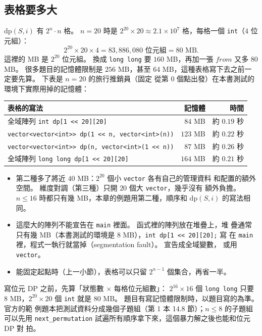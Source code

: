 \subsection{表格要多大}
\label{sec:bm-memory}

$\mathrm{dp}(S, i)$ 有 $2^n \cdot n$ 格。 $n = 20$ 時是 $2^{20} \times 20 \approx 2.1 \times 10^7$
格，每格一個 \texttt{int}（$4$ 位元組）：
\[
2^{20} \times 20 \times 4 = 83{,}886{,}080 \text{ 位元組} = 80 \text{ MB}.
\]
這裡的 MB 是 $2^{20}$ 位元組。 換成 \texttt{long long} 要 $160$ MB，再加一張
$\mathit{from}$ 又多 $80$ MB。 很多題目的記憶體限制是 $256$ MB，甚至
$64$ MB，這種表格寫下去之前一定要先算。 下表是 $n = 20$ 的旅行推銷員（固定
從第 $0$ 個點出發）在本書測試的環境下實際用掉的記憶體：

\begin{center}
\begin{tabular}{lrr}
\toprule
表格的寫法 & 記憶體 & 時間 \\
\midrule
全域陣列 \texttt{int dp[1 << 20][20]} & $84$ MB & 約 $0.19$ 秒 \\
\texttt{vector<vector<int>> dp(1 << n, vector<int>(n))} & $123$ MB & 約 $0.22$ 秒 \\
\texttt{vector<vector<int>> dp(n, vector<int>(1 << n))} & $87$ MB & 約 $0.26$ 秒 \\
全域陣列 \texttt{long long dp[1 << 20][20]} & $164$ MB & 約 $0.21$ 秒 \\
\bottomrule
\end{tabular}
\end{center}

\begin{itemize}
\item 第二種多了將近 $40$ MB：$2^{20}$ 個小 \texttt{vector} 各有自己的管理資料
和配置的額外空間。 維度對調（第三種）只開 $20$ 個大 \texttt{vector}，幾乎沒有
額外負擔。 $n \le 16$ 時都只有幾 MB，本章的例題用第二種，順序和
$\mathrm{dp}(S, i)$ 的寫法相同。
\item 這麼大的陣列不能宣告在 \texttt{main} 裡面。 函式裡的陣列放在堆疊上，堆
疊通常只有幾 MB（本書測試的環境是 $8$ MB），\texttt{int dp[1 << 20][20];} 寫
在 \texttt{main} 裡，程式一執行就當掉（segmentation fault）。 宣告成全域變數，
或用 \texttt{vector}。
\item 能固定起點時（上一小節），表格可以只留 $2^{n - 1}$ 個集合，再省一半。
\end{itemize}

\begin{apcsnote}
寫位元 DP 之前，先算「狀態數 $\times$ 每格位元組數」：
$2^{16} \times 16$ 個 \texttt{long long} 只要 $8$ MB，$2^{20} \times 20$ 個
\texttt{int} 就是 $80$ MB。 題目有寫記憶體限制時，以題目寫的為準。 官方的範
例題本把測試資料分成幾個子題組（第 1 本 14.8 節）；$n \le 8$ 的子題組可以先用
\texttt{next\_permutation} 試遍所有順序拿下來，這個暴力解之後也能和位元 DP 對
拍。
\end{apcsnote}

